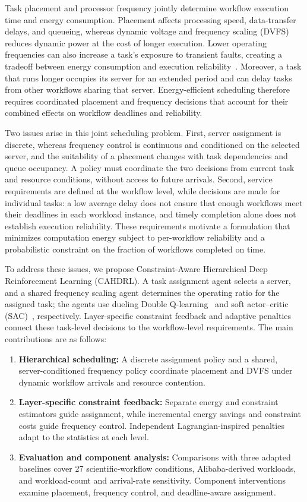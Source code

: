 \documentclass[journal]{IEEEtran}
\begin{document}
Task placement and processor frequency jointly determine workflow execution time and energy consumption. Placement affects processing speed, data-transfer delays, and queueing, whereas dynamic voltage and frequency scaling (DVFS) reduces dynamic power at the cost of longer execution. Lower operating frequencies can also increase a task's exposure to transient faults, creating a tradeoff between energy consumption and execution reliability~\cite{zhu2004,esnaashari2025dream}. Moreover, a task that runs longer occupies its server for an extended period and can delay tasks from other workflows sharing that server. Energy-efficient scheduling therefore requires coordinated placement and frequency decisions that account for their combined effects on workflow deadlines and reliability.

Two issues arise in this joint scheduling problem. First, server assignment is discrete, whereas frequency control is continuous and conditioned on the selected server, and the suitability of a placement changes with task dependencies and queue occupancy. A policy must coordinate the two decisions from current task and resource conditions, without access to future arrivals. Second, service requirements are defined at the workflow level, while decisions are made for individual tasks: a low average delay does not ensure that enough workflows meet their deadlines in each workload instance, and timely completion alone does not establish execution reliability. These requirements motivate a formulation that minimizes computation energy subject to per-workflow reliability and a probabilistic constraint on the fraction of workflows completed on time.

To address these issues, we propose Constraint-Aware Hierarchical Deep Reinforcement Learning (CAHDRL). A task assignment agent selects a server, and a shared frequency scaling agent determines the operating ratio for the assigned task; the agents use dueling Double Q-learning~\cite{vanhasselt2016,wang2016dueling} and soft actor--critic (SAC)~\cite{haarnoja2018}, respectively. Layer-specific constraint feedback and adaptive penalties connect these task-level decisions to the workflow-level requirements. The main contributions are as follows:
\begin{enumerate}
\item \textbf{Hierarchical scheduling:} A discrete assignment policy and a shared, server-conditioned frequency policy coordinate placement and DVFS under dynamic workflow arrivals and resource contention.
\item \textbf{Layer-specific constraint feedback:} Separate energy and constraint estimators guide assignment, while incremental energy savings and constraint costs guide frequency control. Independent Lagrangian-inspired penalties adapt to the statistics at each level.
\item \textbf{Evaluation and component analysis:} Comparisons with three adapted baselines cover 27 scientific-workflow conditions, Alibaba-derived workloads, and workload-count and arrival-rate sensitivity. Component interventions examine placement, frequency control, and deadline-aware assignment.
\end{enumerate}
\end{document}
